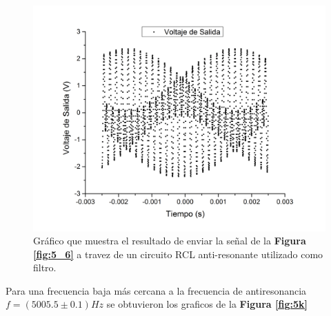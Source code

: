 \documentclass[11pt,a4paper]{article}
\begin{document}
\begin{figure}[H]
\centering
\includegraphics[scale=0.4]{5600hz_Filtrado}
\caption{Gráfico que muestra el resultado de enviar la señal de la \textbf{Figura \ref{fig:5_6}} a travez de un circuito RCL anti-resonante utilizado como filtro.}
\label{fig:5_6_Filt}
\end{figure}

Para una frecuencia baja más cercana a la frecuencia de antiresonancia $f= (5005.5 \pm 0.1)Hz$ se obtuvieron los graficos de la \textbf{Figura \ref{fig:5k}}
\end{document}
